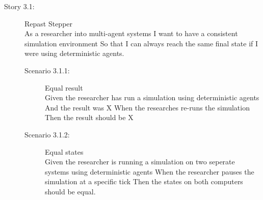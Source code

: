 \begin{description}
\item[Story 3.1:] Repast Stepper\\
As a researcher into multi-agent systems
I want to have a consistent simulation environment
So that I can always reach the same final state  if I were using \gls{deterministic} agents.

\begin{description}
\item[Scenario 3.1.1:] Equal result\\
Given the researcher has run a simulation using deterministic agents
And the result was X
When the researches re-runs the simulation
Then the result should be X

\item[Scenario 3.1.2:] Equal states\\
Given the researcher is running a simulation on two seperate systems using deterministic agents
When the researcher pauses the simulation at a specific tick
Then the states on both computers should be equal.
\end{description}
\end{description}




